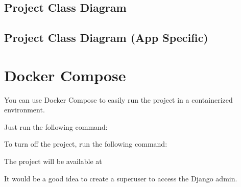 \documentclass[letterpaper,10pt,english]{sphinxmanual}
\begin{document}
\section{Project Class Diagram}
\label{\detokenize{modules/diagrams:project-class-diagram}}


\section{Project Class Diagram (App Specific)}
\label{\detokenize{modules/diagrams:project-class-diagram-app-specific}}

\sphinxstepscope


\chapter{Docker Compose}
\label{\detokenize{modules/docker:docker-compose}}\label{\detokenize{modules/docker::doc}}
\sphinxAtStartPar
You can use Docker Compose to easily run the project in a containerized environment.

\sphinxAtStartPar
Just run the following command:

\begin{sphinxVerbatim}[commandchars=\\\{\}]
\end{sphinxVerbatim}

\sphinxAtStartPar
To turn off the project, run the following command:

\begin{sphinxVerbatim}[commandchars=\\\{\}]
\end{sphinxVerbatim}

\sphinxAtStartPar
The project will be available at 

\sphinxAtStartPar
It would be a good idea to create a superuser to access the Django admin.

\begin{sphinxVerbatim}[commandchars=\\\{\}]
\end{sphinxVerbatim}
\end{document}
